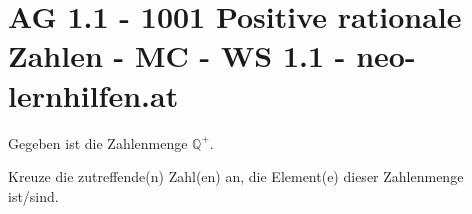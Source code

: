 \section{AG 1.1 - 1001 Positive rationale Zahlen - MC - WS 1.1 - neo-lernhilfen.at}

\begin{beispiel}[AG 1.1]{1} %
				Gegeben ist die Zahlenmenge $\mathbb{Q}^{+}$.
				
				Kreuze die zutreffende(n) Zahl(en) an, die Element(e) dieser Zahlenmenge ist/sind.
\end{beispiel}